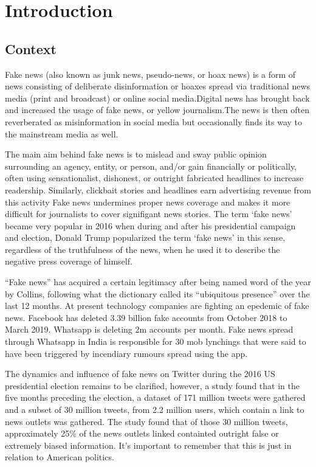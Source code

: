  \chapter{Introduction}
 \section{Context}
Fake news (also known as junk news, pseudo-news, or hoax news) is a form of news consisting of deliberate disinformation or hoaxes spread via traditional news media \cite{murphy2019false}
(print and broadcast) or online social media.Digital news has brought back and increased the usage of fake news, or yellow journalism.The news is then often reverberated
as misinformation in social media but occasionally finds its way to the mainstream media as well.

The main aim behind fake news is to mislead and sway public opinion surrounding an agency, entity, or person, and/or gain financially or politically, often using sensationalist,
dishonest, or outright fabricated headlines to increase readership. Similarly, clickbait stories and headlines earn advertising revenue from this activity Fake news undermines proper
news coverage and makes it more difficult for journalists to cover signifigant news stories. The term `fake news' became very popular in 2016 when during and after his presidential
campaign and election, Donald Trump popularized the term `fake news' in this sense, regardless of the truthfulness of the news, when he used it to describe the negative press coverage of himself.

“Fake news” has acquired a certain legitimacy after being named word of the year by Collins, following what the dictionary called its “ubiquitous presence” over the last 12 months. At present technology companies are fighting an epedemic of fake news. Facebook has deleted 3.39 billion fake accounts from October 2018 to March 2019. Whatsapp is deleting 2m accounts per month. Fake news spread through Whatsapp in India is responsible for 30 mob lynchings that were said to have been triggered by incendiary rumours spread using the app. 

The dynamics and influence of fake news on Twitter during the 2016 US presidential election remains to be clarified, however, a study found that in the five months preceding the election, a dataset of 171 million tweets were gathered and a subset of 30 million tweets, from 2.2 million users, which contain a link to news outlets was gathered. The study found that of those 30 million tweets, approximately 25\% of the news outlets linked containted outright false or extremely biased information\cite{bovet2019influence}. It's important to remember that this is just in relation to American politics.

